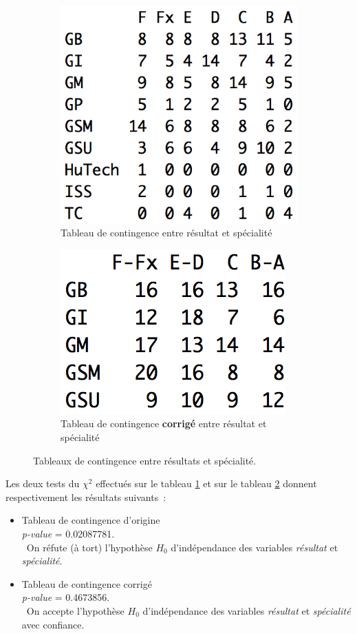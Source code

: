 \documentclass[a4paper,11pt]{report}
\begin{document}
\begin{figure}[H]
	\centering
	\captionsetup{justification=centering, margin=2cm}
	\begin{subfigure}[b]{0.5\linewidth}
		\centering
		\captionsetup{justification=centering, margin=1cm}
		\includegraphics[width=0.5\linewidth]{img/1-1-2-Contingence-Result-Specialite-Origine}
		\caption{\scriptsize Tableau de contingence entre résultat et spécialité}
		\label{fig:tab_contingence_diplome_specialite_origine}
	\end{subfigure}%
	\begin{subfigure}[b]{0.5\linewidth}
		\centering
		\captionsetup{justification=centering, margin=1cm}
		\includegraphics[width=0.5\linewidth]{img/1-1-2-Contingence-Result-Specialite-Corrige}
		\caption{\scriptsize Tableau de contingence \textbf{corrigé} entre résultat et spécialité}
		\label{fig:tab_contingence_diplome_specialite_corrige}
	\end{subfigure}%
	\caption{
		\small Tableaux de contingence entre résultats et spécialité.
	}
	\label{fig:tabs_contingence_resultats_specialite}%
\end{figure}

Les deux tests du $\chi^2$ effectués sur le tableau \ref{fig:tab_contingence_diplome_specialite_origine} et sur le tableau \ref{fig:tab_contingence_diplome_specialite_corrige} donnent respectivement les résultats suivants~:
\begin{itemize}
	\item Tableau de contingence d'origine
	\\ \textit{p-value} = 0.02087781.
	\\ On réfute (à tort) l'hypothèse $H_{0}$ d'indépendance des variables \textit{résultat} et \textit{spécialité}.
	
	\item Tableau de contingence corrigé
	\\ \textit{p-value} = 0.4673856.
	\\ On accepte l'hypothèse $H_{0}$ d'indépendance des variables \textit{résultat} et \textit{spécialité} avec confiance.
\end{itemize}
\end{document}
